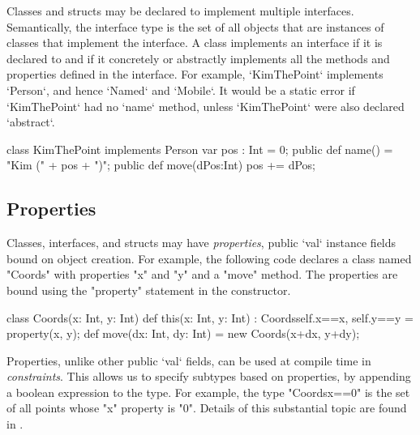 Classes and structs may be declared to implement multiple interfaces. Semantically, the
interface type is the set of all objects that are instances of classes that
implement the interface. A class implements an interface if it is declared to
and if it concretely or abstractly implements all the methods and properties
defined in the interface. For example, \xcd`KimThePoint` implements
\xcd`Person`, and hence \xcd`Named` and \xcd`Mobile`. It would be a static
error if \xcd`KimThePoint` had no \xcd`name` method, unless \xcd`KimThePoint` were also
declared \xcd`abstract`.

\begin{xten}
class KimThePoint implements Person {
   var pos : Int = 0;
   public def name() = "Kim (" + pos + ")";
   public def move(dPos:Int) { pos += dPos; }
}
\end{xten}
%


\subsection{Properties}
\label{properties}

Classes, interfaces, and structs may have {\em properties}, public \xcd`val` instance
fields bound on object creation. For example, the following code declares a
class named \xcd"Coords" with properties \xcd"x" and \xcd"y" and a \xcd"move"
method. The properties are bound using the \xcd"property" statement in the
constructor.

\begin{xten}
class Coords(x: Int, y: Int) {
  def this(x: Int, y: Int) : Coords{self.x==x, self.y==y} 
    = { property(x, y); }
  def move(dx: Int, dy: Int) = new Coords(x+dx, y+dy);
}
\end{xten}

Properties, unlike other public \xcd`val` fields, can be used  
at compile time in {\em constraints}. This allows us
to specify subtypes based on properties, by appending a boolean expression to
the type. For example, the type \xcd"Coords{x==0}" is the set of all points
whose \xcd"x" property is \xcd"0".  Details of this substantial topic are
found in .



